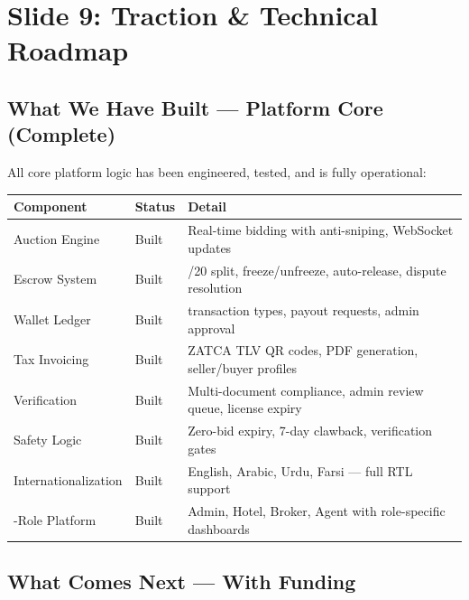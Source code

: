 \documentclass[11pt,a4paper]{article}
\begin{document}
\newpage

\section*{Slide 9: Traction \& Technical Roadmap}

\subsection*{What We Have Built --- Platform Core (Complete)}

All core platform logic has been engineered, tested, and is fully operational:

\vspace{0.3cm}

\begin{center}
\begin{tabular}{|>{\raggedright\arraybackslash}p{3.5cm}|>{\raggedright\arraybackslash}p{1.5cm}|>{\raggedright\arraybackslash}p{8.5cm}|}
\hline
\rowcolor{headergray}
\textbf{Component} & \textbf{Status} & \textbf{Detail} \\
\hline
Auction Engine & Built & Real-time bidding with anti-sniping, WebSocket updates \\
\hline
Escrow System & Built & 80/20 split, freeze/unfreeze, auto-release, dispute resolution \\
\hline
Wallet Ledger & Built & 6 transaction types, payout requests, admin approval \\
\hline
Tax Invoicing & Built & ZATCA TLV QR codes, PDF generation, seller/buyer profiles \\
\hline
Verification & Built & Multi-document compliance, admin review queue, license expiry \\
\hline
Safety Logic & Built & Zero-bid expiry, 7-day clawback, verification gates \\
\hline
Internationalization & Built & English, Arabic, Urdu, Farsi --- full RTL support \\
\hline
4-Role Platform & Built & Admin, Hotel, Broker, Agent with role-specific dashboards \\
\hline
\end{tabular}
\end{center}

\vspace{0.5cm}

\subsection*{What Comes Next --- With Funding}
\end{document}
